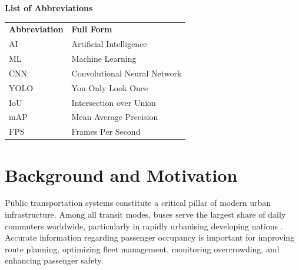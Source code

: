 \documentclass[12pt,a4paper]{report}
\begin{document}
\clearpage

\renewcommand{\contentsname}{Table of Contents}
\tableofcontents
\clearpage

\listoffigures
{}
\clearpage

\listoftables
{}
\clearpage

\newpage
{}
{}
\begin{center}
    \Large\textbf{List of Abbreviations}
\end{center}
\vspace{1cm}

\noindent
\begin{tabular}{ll}
    \textbf{Abbreviation} & \textbf{Full Form} \\[0.3cm]
    AI   & Artificial Intelligence \\
    ML   & Machine Learning \\
    CNN  & Convolutional Neural Network \\
    YOLO & You Only Look Once \\
    IoU  & Intersection over Union \\
    mAP  & Mean Average Precision \\
    FPS  & Frames Per Second \\
\end{tabular}

\clearpage

\section{Background and Motivation}

Public transportation systems constitute a critical pillar of modern urban infrastructure. Among all transit modes, buses serve the largest share of daily commuters worldwide, particularly in rapidly urbanising developing nations \cite{itf_outlook_2023}. Accurate information regarding passenger occupancy is important for improving route planning, optimizing fleet management, monitoring overcrowding, and enhancing passenger safety.
\end{document}
